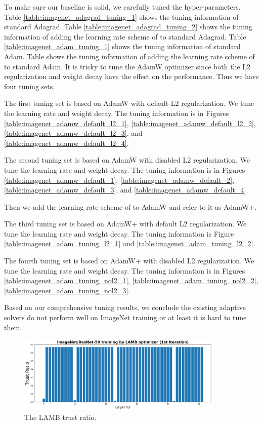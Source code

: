 To make sure our baseline is solid, we carefully tuned the hyper-parameters.
Table \ref{table:imagenet_adagrad_tuning_1} shows the tuning information of standard Adagrad.
Table \ref{table:imagenet_adagrad_tuning_2} shows the tuning information of adding the learning rate scheme of \cite{goyal2017accurate} to standard Adagrad.
Table \ref{table:imagenet_adam_tuning_1} shows the tuning information of standard Adam.
Table \label{table:imagenet_adam_tuning_2} shows the tuning information of adding the learning rate scheme of \cite{goyal2017accurate} to standard Adam.
It is tricky to tune the AdamW optimizer since both the L2 regularization and weight decay have the effect on the performance.
Thus we have four tuning sets.

The first tuning set is based on AdamW with default L2 regularization.
We tune the learning rate and weight decay.
The tuning information is in Figures \ref{table:imagenet_adamw_default_l2_1}, \ref{table:imagenet_adamw_default_l2_2}, \ref{table:imagenet_adamw_default_l2_3}, and \ref{table:imagenet_adamw_default_l2_4}.

The second tuning set is based on AdamW with disabled L2 regularization.
We tune the learning rate and weight decay.
The tuning information is in Figures \ref{table:imagenet_adamw_default_1}, \ref{table:imagenet_adamw_default_2}, \ref{table:imagenet_adamw_default_3}, and \ref{table:imagenet_adamw_default_4}.

Then we add the learning rate scheme of \cite{goyal2017accurate} to AdamW and refer to it as AdamW+.

The third tuning set is based on AdamW+ with default L2 regularization.
We tune the learning rate and weight decay.
The tuning information is Figure \ref{table:imagenet_adam_tuning_l2_1} and \ref{table:imagenet_adam_tuning_l2_2}.

The fourth tuning set is based on AdamW+ with disabled L2 regularization.
We tune the learning rate and weight decay.
The tuning information is in Figures \ref{table:imagenet_adam_tuning_nol2_1}, \ref{table:imagenet_adam_tuning_nol2_2}, \ref{table:imagenet_adam_tuning_nol2_3}.

Based on our comprehensive tuning results, we conclude the existing adaptive solvers do not perform well on ImageNet training or at least it is hard to tune them.



\begin{figure}[tb]
\vspace{5pt}
\centering
\includegraphics[width=0.88\textwidth]{figs/lamb_ratio_1.png}
\caption{The LAMB trust ratio.}
\label{fig:lamb_ratio_1}
\vspace{-10pt}
\end{figure}

